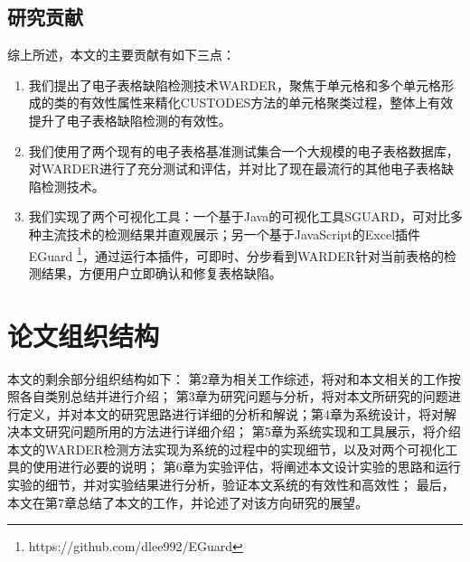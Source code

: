 \subsection{研究贡献}

综上所述，本文的主要贡献有如下三点：

\begin{enumerate}
    \item 我们提出了电子表格缺陷检测技术WARDER，聚焦于单元格和多个单元格形成的类的有效性属性来精化CUSTODES方法的单元格聚类过程，整体上有效提升了电子表格缺陷检测的有效性。
    \item 我们使用了两个现有的电子表格基准测试集合一个大规模的电子表格数据库，对WARDER进行了充分测试和评估，并对比了现在最流行的其他电子表格缺陷检测技术。
    \item 我们实现了两个可视化工具：一个基于Java的可视化工具SGUARD\cite{li2019sguard}，可对比多种主流技术的检测结果并直观展示；另一个基于JavaScript的Excel插件 EGuard \footnote{https://github.com/dlee992/EGuard}，通过运行本插件，可即时、分步看到WARDER针对当前表格的检测结果，方便用户立即确认和修复表格缺陷。
\end{enumerate}

\section{论文组织结构}

本文的剩余部分组织结构如下：
第2章为相关工作综述，将对和本文相关的工作按照各自类别总结并进行介绍；
第3章为研究问题与分析，将对本文所研究的问题进行定义，并对本文的研究思路进行详细的分析和解说；第4章为系统设计，将对解决本文研究问题所用的方法进行详细介绍；
第5章为系统实现和工具展示，将介绍本文的WARDER检测方法实现为系统的过程中的实现细节，以及对两个可视化工具的使用进行必要的说明；
第6章为实验评估，将阐述本文设计实验的思路和运行实验的细节，并对实验结果进行分析，验证本文系统的有效性和高效性；
最后，本文在第7章总结了本文的工作，并论述了对该方向研究的展望。